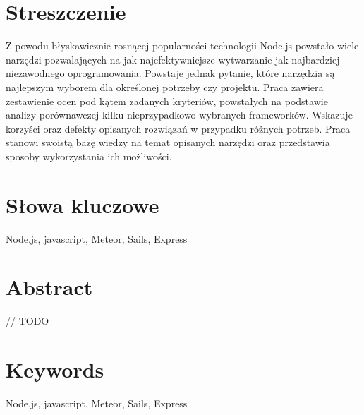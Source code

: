 \documentclass[12pt]{report}
\begin{document}
\section*{Streszczenie}
Z powodu błyskawicznie rosnącej popularności technologii Node.js powstało wiele narzędzi pozwalających na jak najefektywniejsze wytwarzanie jak najbardziej niezawodnego oprogramowania.
Powstaje jednak pytanie, które narzędzia są najlepszym wyborem dla określonej potrzeby czy projektu. 
Praca zawiera zestawienie ocen pod kątem zadanych kryteriów, powstałych na podstawie analizy porównawczej kilku nieprzypadkowo wybranych frameworków.
Wskazuje korzyści oraz defekty opisanych rozwiązań w przypadku różnych potrzeb.
\newline
Praca stanowi swoistą bazę wiedzy na temat opisanych narzędzi oraz przedstawia sposoby wykorzystania ich możliwości. 

\section*{Słowa kluczowe}
Node.js, javascript, Meteor, Sails, Express

\section*{Abstract}
// TODO

\section*{Keywords}
Node.js, javascript, Meteor, Sails, Express
\end{document}
